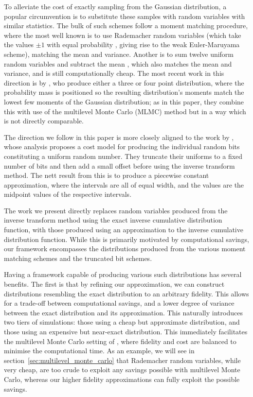 \documentclass[9pt,a4paper,english]{extarticle}
\begin{document}
To alleviate the cost of exactly sampling from the Gaussian distribution, a popular circumvention is to substitute these samples with random variables with similar statistics. The bulk of such schemes follow a moment matching procedure, where the most well known is to use Rademacher random variables (which take the values $ \pm 1 $ with equal probability \citep[page~XXXII]{kloeden1999numerical}, giving rise to the weak Euler-Maruyama scheme), matching the mean and variance. Another is to sum twelve uniform random variables and subtract the mean \citep[page~500]{munk2011fixed}, which also matches the mean and variance, and is still computationally cheap. The most recent work in this direction is by \citet{muller2015improving}, who produce either a three or four point distribution, where the probability mass is positioned so the resulting distribution's moments match the lowest few moments of the Gaussian distribution; as in this paper, they combine this with use of the multilevel Monte Carlo (MLMC) method but in a way which is not directly comparable.

The direction we follow in this paper is more closely aligned to the work by \citet{giles2019random_quadrature,giles2019random_multilevel}, whose analysis proposes a cost model for producing the individual random bits constituting a uniform random number. They truncate their uniforms to a fixed number of bits and then add a small offset before using the inverse transform method. The nett result from this is to produce a piecewise constant approximation, where the intervals are all of equal width, and the values are the midpoint values of the respective intervals. 

The work we present directly replaces random variables produced from the inverse transform method using the exact inverse cumulative distribution function, with those produced using an approximation to the inverse cumulative distribution function. While this is primarily motivated by computational savings, our framework encompasses the distributions produced from the various moment matching schemes and the truncated bit schemes. 

Having a framework capable of producing various such distributions has several benefits. The first is that by refining our approximation, we can construct distributions resembling the exact distribution to an arbitrary fidelity. This allows for a trade-off between computational savings, and a lower degree of variance between the exact distribution and its approximation. This naturally  introduces two tiers of simulations: those using a cheap but approximate distribution, and those using an expensive but near-exact distribution. This immediately facilitates the multilevel Monte Carlo setting of \citet{giles2008multilevel}, where fidelity and cost are balanced to minimise the computational time. As an example, we will see in section~\ref{sec:multilevel_monte_carlo} that Rademacher random variables, while very cheap, are too crude to exploit any savings possible with multilevel Monte Carlo, whereas our higher fidelity approximations can fully exploit the possible savings. 
\end{document}
